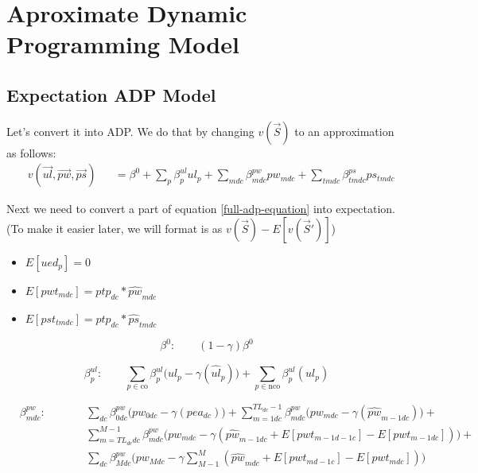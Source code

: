 

\section{Aproximate Dynamic Programming Model}
\subsection{Expectation ADP Model}
Let's convert it into ADP. We do that by changing $v(\vec{S})$ to an approximation as follows:
\begin{equation}\begin{alignedat}{10}
		& v(\vec{ul}, \vec{pw}, \vec{ps}) 
		&& =  \beta^0 + \sum_{p} \beta_{p}^{ul} ul_{p} +
		\sum_{mdc} \beta_{mdc}^{pw} pw_{mdc}  + 
		\sum_{tmdc} \beta_{tmdc}^{ps} ps_{tmdc}
\end{alignedat} \end{equation}

Next we need to convert a part of equation \ref{full-adp-equation} into expectation. \\ 
(To make it easier later, we will format is as $v(\vec{S}) - E[v(\vec{S}')]$)

\begin{itemize}
	\item $E[ued_p] = 0$
	\item $E[pwt_{mdc}] = ptp_{dc} * \hat{pw}_{mdc}$ 
	\item $E[pst_{tmdc}] = ptp_{dc} * \hat{ps}_{tmdc}$ 
\end{itemize}

\begin{fleqn}[\parindent]
	\begin{equation}
		\beta^{0}: \qquad (1-\gamma) \beta^{0}
	\end{equation}
\end{fleqn}

\begin{fleqn}[\parindent]
	\begin{equation}
		\beta^{ul}_{p}: \qquad 
		\sum_{p \in \text{co}} \beta_{p}^{ul} \Big( ul_{p} - \gamma ( \hat{ul}_{p}) \Big) + 
		\sum_{p \in \text{nco}} \beta_{p}^{ul} ( ul_{p}) 
	\end{equation}
\end{fleqn}

\begin{fleqn}[\parindent]
	\begin{equation}\begin{alignedat}{10}
			& \beta^{pw}_{mdc}: \qquad 
			&& 	\sum_{dc} \beta_{0dc}^{pw} \Big( pw_{0dc} - \gamma (pea_{dc}) \Big) +
			\sum_{m=1dc}^{TL_{dc}-1} \beta_{mdc}^{pw} 
			\Big( pw_{mdc} - \gamma 
			(\hat{pw}_{m-1dc}) \Big) + \\
			& && \sum_{m=TL_{dc}dc}^{M-1} \beta_{mdc}^{pw} 
			\Big( pw_{mdc} - \gamma 
			(\hat{pw}_{m-1dc} + E[pwt_{m-1d-1c}] - E[pwt_{m-1dc}]) \Big) + \\
			& && \sum_{dc} \beta_{Mdc}^{pw} 
			\Big( pw_{Mdc} - \gamma \sum_{M-1}^{M}
			(\hat{pw}_{mdc} + E[pwt_{md-1c}] - E[pwt_{mdc}]) \Big)
	\end{alignedat} \end{equation}
\end{fleqn}

